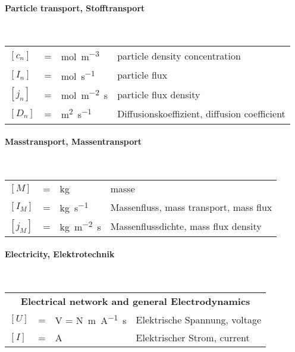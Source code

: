 {\begin{multicols}{2}
		\paragraph{Particle transport, Stofftransport}~\\
		\begin{tabularx}{\linewidth}{lclX}
			$[c_n]$ &=& \si{\mole\per\meter\cubed} & particle density concentration\\
			$[I_n]$ &=& \si{\mole\per\second} & particle flux\\
			$[j_n]$ &=& \si{\mole\per\meter\squared\second} & particle flux density\\
			$[D_n]$ &=& \si{\meter\squared\per\second} & Diffusionskoeffizient, diffusion coefficient\\
		\end{tabularx}
			
		\paragraph{Masstransport, Massentransport}~\\
		\begin{tabularx}{\linewidth}{lclX}
			$[M]$ &=& \si{\kilogram} & masse\\			
			$[I_{M}]$ &=& \si{\kilogram\per\second} & Massenfluss, mass transport, mass flux\\			
			$[j_M]$ &=& \si{\kilogram\per\meter\squared\second} & Massenflussdichte, mass flux density\\
		\end{tabularx}
	\end{multicols}
	
	\paragraph{Electricity, Elektrotechnik}~\\
	
	\begin{tabularx}{\linewidth}{lclX}
		\multicolumn{4}{c}{\textbf{Electrical network and general Electrodynamics}}\\
		$[U]$ &=& \si{\volt} = \si{\newton\meter\per\ampere\second} & Elektrische Spannung, voltage \\
		$[I]$ &=& \si{\ampere} & Elektrischer Strom, current \\


\end{tabularx}}
